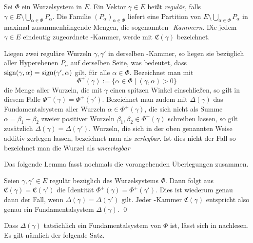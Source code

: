 \begin{defn}
  Sei $\Phi$ ein Wurzelsystem in $E$.
  Ein Vektor $\gamma \in E$ heißt \emph{regulär}, falls $\gamma \in E \setminus \bigcup_{\alpha \in \Phi} P_\alpha$.
  Die Familie $(P_\alpha)_{\alpha \in \Phi}$ liefert eine Partition von $E\setminus \bigcup_{\alpha \in \Phi} P_\alpha$ in maximal zusammenhängende Mengen, die sogenannten \emph{\weyl\hyp{}Kammern}.
  Die jedem $\gamma \in E$ eindeutig zugeordnete \weyl\hyp{}Kammer, werde mit $\mathfrak{C}(\gamma)$ bezeichnet.
\end{defn}

Liegen zwei reguläre Wurzeln $\gamma, \gamma'$ in derselben \weyl\hyp{}Kammer, so liegen sie bezüglich aller Hyperebenen $P_\alpha$ auf derselben Seite, was bedeutet, dass $\operatorname{sign} (\gamma, \alpha) = \operatorname{sign}( \gamma', \alpha)$ gilt, für alle $\alpha \in \Phi$.
Bezeichnet man mit
\begin{displaymath}
  \Phi^+(\gamma) := \{ \alpha \in \Phi \mid (\gamma, \alpha) > 0 \}
\end{displaymath}
die Menge aller Wurzeln, die mit $\gamma$ einen spitzen Winkel einschließen, so gilt in diesem Falle $\Phi^+(\gamma) = \Phi^+(\gamma')$.
Bezeichnet man zudem mit $\Delta(\gamma)$ das Fundamentalsystem aller Wurzeln $\alpha \in \Phi^+(\gamma)$, die sich nicht als Summe $\alpha = \beta_1 + \beta_2$ zweier positiver Wurzeln $\beta_1, \beta_2 \in \Phi^+(\gamma)$ schreiben lassen, so gilt zusätzlich $\Delta(\gamma) = \Delta(\gamma')$. 
Wurzeln, die sich in der oben genannten Weise additiv zerlegen lassen, bezeichnet man als \emph{zerlegbar}. 
Ist dies nicht der Fall so bezeichnet man die Wurzel als \emph{unzerlegbar}

Das folgende Lemma fasst nochmals die vorangehenden Überlegungen zusammen.

\begin{lem}
  Seien $\gamma, \gamma' \in E$ regulär bezüglich des Wurzelsystems $\Phi$.
  Dann folgt aus $\mathfrak{C}(\gamma) = \mathfrak{C}(\gamma')$ die Identität $\Phi^+(\gamma) = \Phi^+(\gamma')$. 
  Dies ist wiederum genau dann der Fall, wenn $\Delta(\gamma) = \Delta(\gamma')$ gilt.
  Jeder \weyl\hyp{}Kammer $\mathfrak{C}(\gamma)$ entspricht also genau ein Fundamentalsystem $\Delta(\gamma)$. \qed
\end{lem}

Dass $\Delta(\gamma)$ tatsächlich ein Fundamentalsystem von $\Phi$ ist, lässt sich in \cite[S.48]{humphreys1972introduction} nachlesen.
Es gilt nämlich der folgende Satz.

